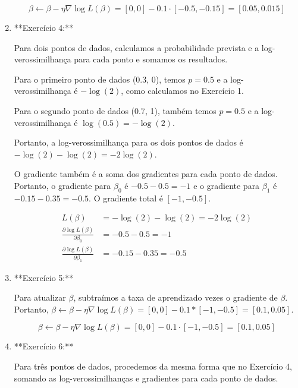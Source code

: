 \documentclass[12pt,a4paper, brazil]{article}
\begin{document}
\begin{enumerate}
\begin{equation*}
\beta \leftarrow \beta - \eta \nabla \log L(\beta) = [0, 0] - 0.1 \cdot [-0.5, -0.15] = [0.05, 0.015]
\end{equation*}

\item  **Exercício 4:**

Para dois pontos de dados, calculamos a probabilidade prevista e a log-verossimilhança para cada ponto e somamos os resultados.

Para o primeiro ponto de dados (0.3, 0), temos $p = 0.5$ e a log-verossimilhança é $-\log(2)$, como calculamos no Exercício 1.

Para o segundo ponto de dados (0.7, 1), também temos $p = 0.5$ e a log-verossimilhança é $\log(0.5) = -\log(2)$.

Portanto, a log-verossimilhança para os dois pontos de dados é $-\log(2) - \log(2) = -2\log(2)$.

O gradiente também é a soma dos gradientes para cada ponto de dados. Portanto, o gradiente para $\beta_0$ é $-0.5 - 0.5 = -1$ e o gradiente para $\beta_1$ é $-0.15 - 0.35 = -0.5$. O gradiente total é $[-1, -0.5]$.


\begin{equation*}
\begin{split}
L(\beta) &= -\log(2) - \log(2) = -2\log(2) \\
\frac{\partial \log L(\beta)}{\partial \beta_0} &= -0.5 - 0.5 = -1 \\
\frac{\partial \log L(\beta)}{\partial \beta_1} &= -0.15 - 0.35 = -0.5
\end{split}
\end{equation*}


\item  **Exercício 5:**

Para atualizar $\beta$, subtraímos a taxa de aprendizado vezes o gradiente de $\beta$. Portanto, $\beta \leftarrow \beta - \eta \nabla \log L(\beta) = [0, 0] - 0.1 * [-1, -0.5] = [0.1, 0.05]$.


\begin{equation*}
\beta \leftarrow \beta - \eta \nabla \log L(\beta) = [0, 0] - 0.1 \cdot [-1, -0.5] = [0.1, 0.05]
\end{equation*}


\item  **Exercício 6:**

Para três pontos de dados, procedemos da mesma forma que no Exercício 4, somando as log-verossimilhanças e gradientes para cada ponto de dados.


\end{enumerate}
\end{document}
